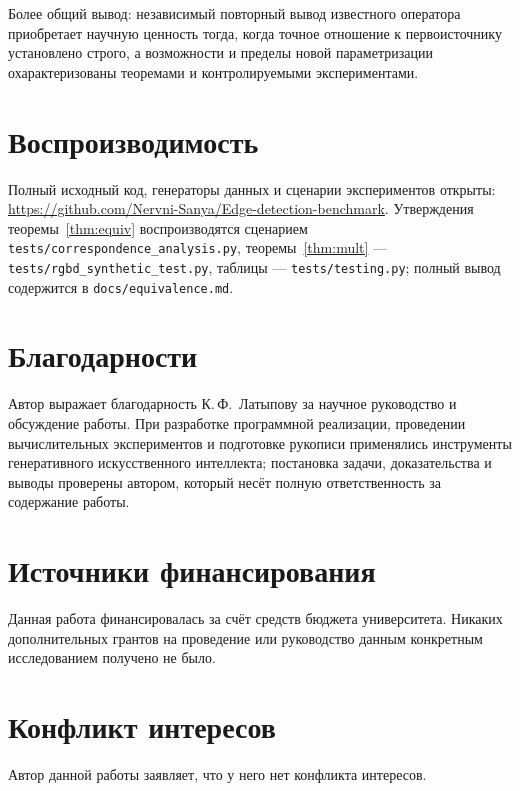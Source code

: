 \documentclass[11pt,a4paper]{article}
\theoremstyle{plain}
\theoremstyle{definition}
\theoremstyle{remark}
\begin{document}
Более общий вывод: независимый повторный вывод известного оператора
приобретает научную ценность тогда, когда точное отношение к
первоисточнику установлено строго, а возможности и пределы новой
параметризации охарактеризованы теоремами и контролируемыми экспериментами.

\section*{Воспроизводимость}

Полный исходный код, генераторы данных и сценарии экспериментов открыты:
\url{https://github.com/Nervni-Sanya/Edge-detection-benchmark}.
Утверждения теоремы~\ref{thm:equiv} воспроизводятся сценарием
\texttt{tests/correspondence\_analysis.py}, теоремы~\ref{thm:mult} ---
\texttt{tests/rgbd\_synthetic\_test.py}, таблицы --- \texttt{tests/testing.py};
полный вывод содержится в \texttt{docs/equivalence.md}.

\section*{Благодарности}

Автор выражает благодарность К.\,Ф.~Латыпову за научное руководство и
обсуждение работы. При разработке программной реализации, проведении
вычислительных экспериментов и подготовке рукописи применялись инструменты
генеративного искусственного интеллекта; постановка задачи, доказательства
и выводы проверены автором, который несёт полную ответственность за
содержание работы.

\section*{Источники финансирования}

Данная работа финансировалась за счёт средств бюджета университета.
Никаких дополнительных грантов на проведение или руководство данным
конкретным исследованием получено не было.

\section*{Конфликт интересов}

Автор данной работы заявляет, что у него нет конфликта интересов.
\end{document}
